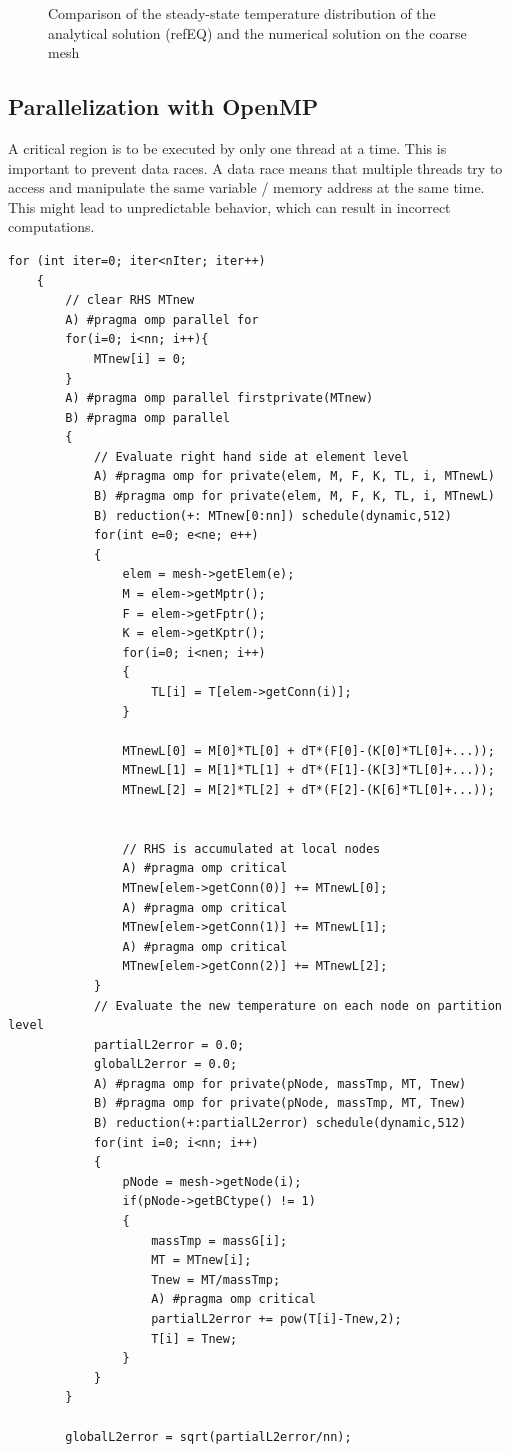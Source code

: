 \documentclass[a4paper, 11pt, oneside]{scrartcl}
\begin{document}
\begin{figure}[!htbp]
	\centering
	\leavevmode
	\resizebox{0.8\width}{!}{}
	\caption{Comparison of the steady-state temperature distribution of the analytical solution (refEQ) and the numerical solution on the coarse mesh}
	\label{fig::TemperatureDist}
\end{figure}

\subsection{Parallelization with OpenMP}

A critical region is to be executed by only one thread at a time. This is important to prevent data races. A data race means that multiple threads try to access and manipulate the same variable / memory address at the same time. This might lead to unpredictable behavior, which can result in incorrect computations. 

\begin{lstlisting}[caption={\label{Code:OpenMP} Parallelization of two most time consuming loops with implementation A and B}]
	for (int iter=0; iter<nIter; iter++)
	{
		// clear RHS MTnew
		A) #pragma omp parallel for
		for(i=0; i<nn; i++){
			MTnew[i] = 0;
		}
		A) #pragma omp parallel firstprivate(MTnew)
		B) #pragma omp parallel
		{
			// Evaluate right hand side at element level
			A) #pragma omp for private(elem, M, F, K, TL, i, MTnewL)
			B) #pragma omp for private(elem, M, F, K, TL, i, MTnewL) 
			B) reduction(+: MTnew[0:nn]) schedule(dynamic,512)
			for(int e=0; e<ne; e++)
			{
				elem = mesh->getElem(e);
				M = elem->getMptr();
				F = elem->getFptr();
				K = elem->getKptr();
				for(i=0; i<nen; i++)
				{
					TL[i] = T[elem->getConn(i)];
				}
				
				MTnewL[0] = M[0]*TL[0] + dT*(F[0]-(K[0]*TL[0]+...));
				MTnewL[1] = M[1]*TL[1] + dT*(F[1]-(K[3]*TL[0]+...));
				MTnewL[2] = M[2]*TL[2] + dT*(F[2]-(K[6]*TL[0]+...));
				
				
				// RHS is accumulated at local nodes
				A) #pragma omp critical
				MTnew[elem->getConn(0)] += MTnewL[0];
				A) #pragma omp critical
				MTnew[elem->getConn(1)] += MTnewL[1];
				A) #pragma omp critical
				MTnew[elem->getConn(2)] += MTnewL[2];
			}
			// Evaluate the new temperature on each node on partition level
			partialL2error = 0.0;
			globalL2error = 0.0;
			A) #pragma omp for private(pNode, massTmp, MT, Tnew)
			B) #pragma omp for private(pNode, massTmp, MT, Tnew) 
			B) reduction(+:partialL2error) schedule(dynamic,512)
			for(int i=0; i<nn; i++)
			{
				pNode = mesh->getNode(i);
				if(pNode->getBCtype() != 1)
				{
					massTmp = massG[i];
					MT = MTnew[i];
					Tnew = MT/massTmp;
					A) #pragma omp critical
					partialL2error += pow(T[i]-Tnew,2);
					T[i] = Tnew;
				}
			}
		}
		
		globalL2error = sqrt(partialL2error/nn);
\end{lstlisting}
\end{document}
